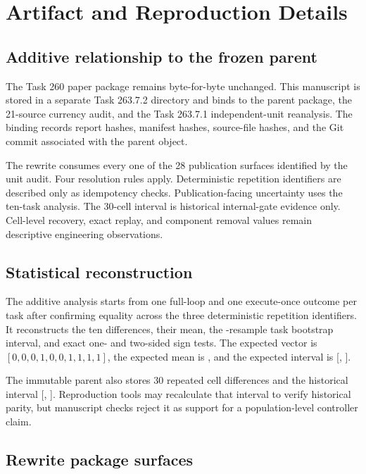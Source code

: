 \section{Artifact and Reproduction Details}
\label{sec:artifact_details}

\subsection{Additive relationship to the frozen parent}

The Task 260 paper package remains byte-for-byte unchanged. This manuscript is
stored in a separate Task 263.7.2 directory and binds to the parent package,
the 21-source currency audit, and the Task 263.7.1 independent-unit
reanalysis. The binding records report hashes, manifest hashes, source-file
hashes, and the Git commit associated with the parent object.

The rewrite consumes every one of the 28 publication surfaces identified by
the unit audit. Four resolution rules apply. Deterministic repetition
identifiers are described only as idempotency checks. Publication-facing
uncertainty uses the ten-task analysis. The 30-cell interval is historical
internal-gate evidence only. Cell-level recovery, exact replay, and component
removal values remain descriptive engineering observations.

\subsection{Statistical reconstruction}

The additive analysis starts from one full-loop and one execute-once outcome
per task after confirming equality across the three deterministic repetition
identifiers. It reconstructs the ten differences, their mean, the
\BootstrapResamples{}-resample task bootstrap interval, and exact one- and
two-sided sign tests. The expected vector is
\([0,0,0,1,0,0,1,1,1,1]\), the expected mean is \TaskLevelGain{}, and the
expected interval is [\TaskLevelCILower{}, \TaskLevelCIUpper{}].

The immutable parent also stores 30 repeated cell differences and the
historical interval [\HistoricalCellCILower{},
\HistoricalCellCIUpper{}]. Reproduction tools may recalculate that interval
to verify historical parity, but manuscript checks reject it as support for a
population-level controller claim.

\subsection{Rewrite package surfaces}

